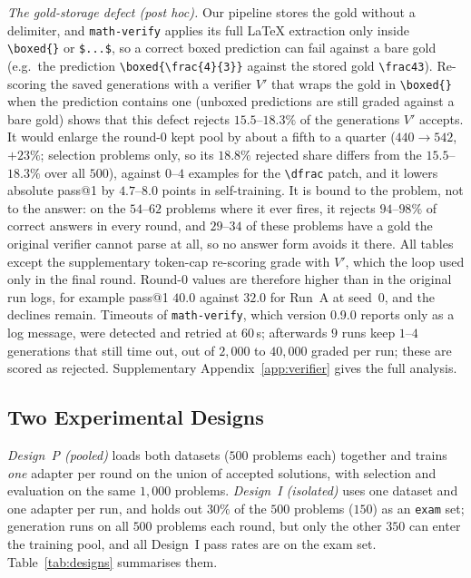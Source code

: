 \documentclass[runningheads]{llncs}
\begin{document}
\emph{The gold-storage defect (post hoc).} Our pipeline stores the gold without
a delimiter, and \texttt{math-verify} applies its full \LaTeX{} extraction only
inside \verb|\boxed{}| or \verb|$...$|, so a correct boxed prediction can fail
against a bare gold (e.g.\ the prediction \verb|\boxed{\frac{4}{3}}| against
the stored gold \verb|\frac43|). Re-scoring the saved generations with a
verifier $V'$ that wraps the gold in \verb|\boxed{}| when the prediction
contains one (unboxed predictions are still graded against a bare gold) shows that this defect rejects $15.5$--$18.3\%$ of the
generations $V'$ accepts. It would enlarge the round-0 kept pool by about a
fifth to a quarter ($440\to542$, $+23\%$; selection problems only, so its $18.8\%$ rejected share differs from the $15.5$--$18.3\%$ over all $500$), against $0$--$4$ examples for the \verb|\dfrac| patch, and
it lowers absolute pass@1 by $4.7$--$8.0$ points in self-training. It is bound
to the problem, not to the answer: on the $54$--$62$ problems where it ever
fires, it rejects $94$--$98\%$ of correct answers in every round, and $29$--$34$
of these problems have a gold the original verifier cannot parse at all, so no
answer form avoids it there. All tables except the supplementary token-cap re-scoring grade with $V'$, which the loop used only in the final round. Round-0 values are therefore higher than in the original run logs, for example pass@1 $40.0$ against $32.0$ for Run~A at seed~0, and the declines remain. Timeouts of \texttt{math-verify}, which version 0.9.0 reports only as a log message, were detected and retried at $60$\,s; afterwards $9$ runs keep $1$--$4$ generations that still time out, out of $2{,}000$ to $40{,}000$ graded per run; these are scored as rejected. Supplementary Appendix~\ref{app:verifier} gives the full analysis.

\subsection{Two Experimental Designs}
\label{sec:designs}

\emph{Design~P (pooled)} loads both datasets ($500$ problems each) together and
trains \emph{one} adapter per round on the union of accepted solutions, with
selection and evaluation on the same $1{,}000$ problems. \emph{Design~I
(isolated)} uses one dataset and one adapter per run, and holds out $30\%$ of the
$500$ problems ($150$) as an \texttt{exam} set; generation runs on all $500$
problems each round, but only the other $350$ can enter the training pool, and
all Design~I pass rates are on the exam set. Table~\ref{tab:designs} summarises
them.
\end{document}
